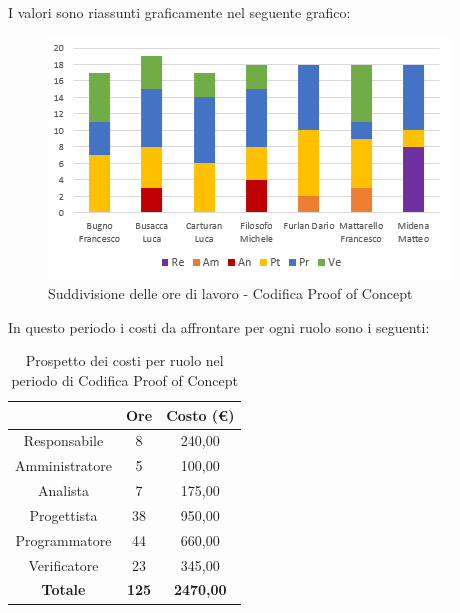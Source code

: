 I valori sono riassunti graficamente nel seguente grafico:

\begin{figure}[H]
  \centering
  \includegraphics[scale=1.2]{immagini/ore_lavoro_PoC.png}
  \caption{Suddivisione delle ore di lavoro - Codifica Proof of Concept}
\end{figure}

\pagebreak
In questo periodo i costi da affrontare per ogni ruolo sono i seguenti:

\begin{table}[H]
  \centering
  \renewcommand{\arraystretch}{1.8}
  \begin{tabular}{c|c|c}
    \rowcolor[HTML]{125E28}
    \multicolumn{1}{c}{\color[HTML]{FFFFFF}\textbf{Ruolo}}
                    & \multicolumn{1}{c}{\color[HTML]{FFFFFF}\textbf{Ore}}
                    & \multicolumn{1}{c}{\color[HTML]{FFFFFF}\textbf{Costo (€)}}                    \\
    \hline
    Responsabile    & 8                                                          & 240,00           \\
    Amministratore  & 5                                                          & 100,00           \\
    Analista        & 7                                                          & 175,00           \\
    Progettista     & 38                                                         & 950,00           \\
    Programmatore   & 44                                                         & 660,00           \\
    Verificatore    & 23                                                         & 345,00           \\
    \textbf{Totale} & \textbf{125}                                               & \textbf{2470,00}
  \end{tabular}
  \caption{Prospetto dei costi per ruolo nel periodo di Codifica Proof of Concept}
\end{table}

